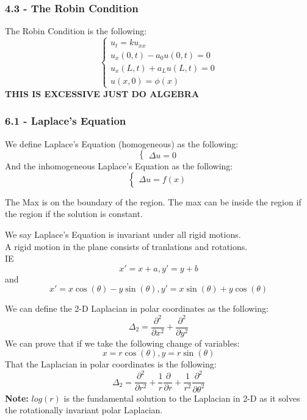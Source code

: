 \documentclass[answers,12pt,addpoints]{exam}
\begin{document}
\subsubsection{4.3 - The Robin Condition}
\begin{definition}
    The Robin Condition is the following:
    $$ \begin{cases}
        u_t = ku_{xx} \\
        u_x(0,t) - a_0 u(0,t) = 0\\
        u_x(L,t) + a_L u(L,t) = 0 \\
        u(x,0) = \phi(x)
    \end{cases}$$
    \textbf{THIS IS EXCESSIVE JUST DO ALGEBRA}

\end{definition}

\subsubsection{6.1 - Laplace's Equation}
\begin{definition}
    We define Laplace's Equation (homogeneous) as the following:
    $$ \begin{cases}
        \Delta u = 0
    \end{cases}$$
    And the inhomogeneous Laplace's Equation as the following:
    $$ \begin{cases}
        \Delta u = f(x) 
    \end{cases}$$
\end{definition}
\begin{definition}
    The Max is on the boundary of the region.
    The max can be inside the region if the region if the solution is constant.
\end{definition}
\begin{definition}
    We say Laplace's Equation is invariant under all rigid motions.\\
    A rigid motion in the plane consists of tranlations and rotations.\\
    IE 
    $$ x' = x + a, y' = y + b$$
    and
    $$ x' = x \cos(\theta) - y \sin(\theta), y' = x \sin(\theta) + y \cos(\theta)$$ 
\end{definition}
\begin{definition}
    We can define the 2-D Laplacian in polar coordinates as the following:
    $$ \Delta_2 = \frac{\partial^2 }{\partial x^2} + \frac{\partial^2 }{\partial y^2} $$
    We can prove that if we take the following change of variables:
    $$ x = r \cos(\theta), y = r \sin(\theta)$$
    That the Laplacian in polar coordinates is the following:
    $$ \Delta_2 = \frac{\partial^2 }{\partial r^2} + \frac{1}{r} \frac{\partial }{\partial r} + \frac{1}{r^2} \frac{\partial^2 }{\partial \theta^2}$$
    \textbf{Note:} $log(r)$ is the fundamental solution to the Laplacian in 2-D as it solves the rotationally invariant polar Laplacian.
\end{definition}
\end{document}

